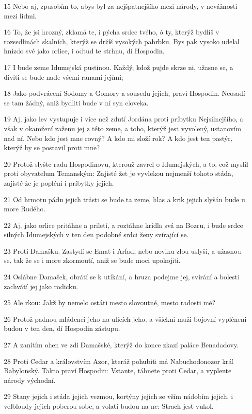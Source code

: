 \par 15 Nebo aj, zpusobím to, abys byl za nejšpatnejšího mezi národy, v nevážnosti mezi lidmi.
\par 16 To, že jsi hrozný, zklamá te, i pýcha srdce tvého, ó ty, kterýž bydlíš v rozsedlinách skalních, kterýž se držíš vysokých pahrbku. Bys pak vysoko udelal hnízdo své jako orlice, i odtud te strhnu, dí Hospodin.
\par 17 I bude zeme Idumejská pustinou. Každý, kdož pujde skrze ni, užasne se, a diviti se bude nade všemi ranami jejími;
\par 18 Jako podvrácení Sodomy a Gomory a sousedu jejich, praví Hospodin. Neosadí se tam žádný, aniž bydliti bude v ní syn cloveka.
\par 19 Aj, jako lev vystupuje i více než zdutí Jordána proti príbytku Nejsilnejšího, a však v okamžení zaženu jej z této zeme, a toho, kterýž jest vyvolený, ustanovím nad ní. Nebo kdo jest mne rovný? A kdo mi složí rok? A kdo jest ten pastýr, kterýž by se postavil proti mne?
\par 20 Protož slyšte radu Hospodinovu, kterouž zavrel o Idumejských, a to, což myslil proti obyvatelum Temanským: Zajisté žet je vyvlekou nejmenší tohoto stáda, zajisté že je popléní i príbytky jejich.
\par 21 Od hrmotu pádu jejich trásti se bude ta zeme, hlas a krik jejich slyšán bude u more Rudého.
\par 22 Aj, jako orlice pritáhne a priletí, a roztáhne krídla svá na Bozru, i bude srdce silných Idumejských v ten den podobné srdci ženy svírající se.
\par 23 Proti Damašku. Zastydí se Emat i Arfad, nebo novinu zlou uslyší, a užasnou se, tak že se i more zkormoutí, aniž se bude moci upokojiti.
\par 24 Oslábne Damašek, obrátí se k utíkání, a hruza podejme jej, svírání a bolesti zachvátí jej jako rodicku.
\par 25 Ale rkou: Jakž by nemelo ostáti mesto slovoutné, mesto radosti mé?
\par 26 Protož padnou mládenci jeho na ulicích jeho, a všickni muži bojovní vypléneni budou v ten den, dí Hospodin zástupu.
\par 27 A zanítím ohen ve zdi Damašské, kterýž do konce zkazí paláce Benadadovy.
\par 28 Proti Cedar a královstvím Azor, kteráž pohubiti má Nabuchodonozor král Babylonský. Takto praví Hospodin: Vstante, táhnete proti Cedar, a vyplente národy východní.
\par 29 Stany jejich i stáda jejich vezmou, kortýny jejich se vším nádobím jejich, i velbloudy jejich poberou sobe, a volati budou na ne: Strach jest vukol.
